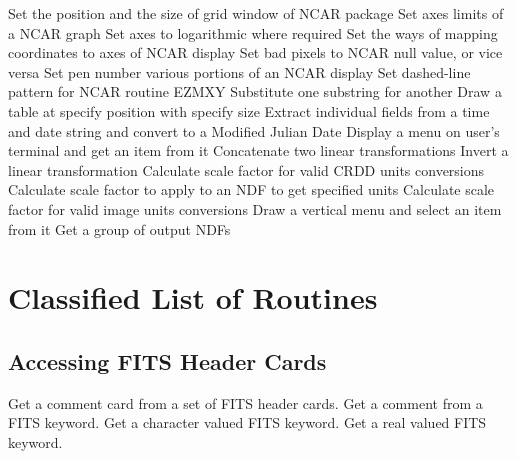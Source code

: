   {Set the position and the size of grid window of NCAR package}
  {Set axes limits of a NCAR graph}
  {Set axes to logarithmic where required}
  {Set the ways of mapping coordinates to axes of NCAR display}
  {Set bad pixels to NCAR null value, or vice versa}
  {Set pen number various portions of an NCAR display}
  {Set dashed-line pattern for NCAR routine EZMXY}
  {Substitute one substring for another}
  {Draw a table at specify position with specify size}
  {Extract individual fields from a time and date string and convert 
   to a Modified Julian Date}
  {Display a menu on user's terminal and get an item from it}
  {Concatenate two linear transformations}
  {Invert a linear transformation}
  {Calculate scale factor for valid CRDD units conversions}
  {Calculate scale factor to apply to an NDF to get specified units}
  {Calculate scale factor for valid image units conversions}
  {Draw a vertical menu and select an item from it}
  {Get a group of output NDFs}


\section{Classified List of Routines}

\subsection {Accessing FITS Header Cards}
  {Get a comment card from a set of FITS header cards.}
  {Get a comment from a FITS keyword.}
  {Get a character valued FITS keyword.}
  {Get a real valued FITS keyword.}


